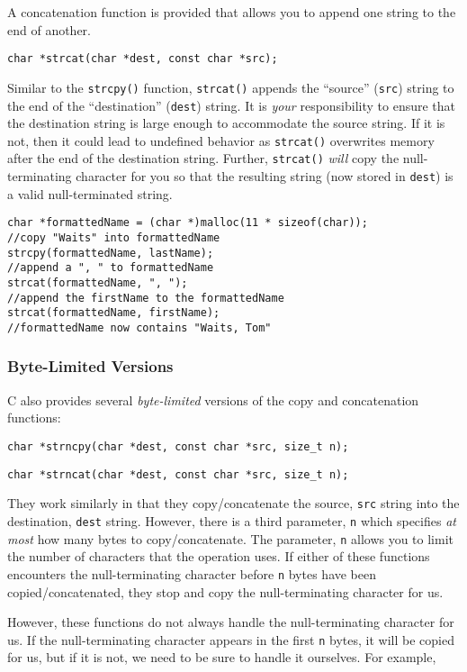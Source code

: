 A concatenation function is provided that allows you 
to append one string to the end of another.

\texttt{char *strcat(char *dest, const char *src);}

Similar to the \texttt{strcpy()} function, 
\texttt{strcat()} appends the ``source'' (\texttt{src})
string to the end of the ``destination'' (\texttt{dest})
string.  It is \emph{your} responsibility to ensure
that the destination string is large enough to accommodate the
source string.  If it is not, then it could lead to undefined
behavior as \texttt{strcat()} overwrites memory after the
end of the destination string.  Further, \texttt{strcat()}
\emph{will} copy the null-terminating character for you so that
the resulting string (now stored in \texttt{dest}) is a
valid null-terminated string.

\begin{verbatim}
char *formattedName = (char *)malloc(11 * sizeof(char));
//copy "Waits" into formattedName
strcpy(formattedName, lastName);
//append a ", " to formattedName
strcat(formattedName, ", ");
//append the firstName to the formattedName
strcat(formattedName, firstName);
//formattedName now contains "Waits, Tom"
\end{verbatim}

\subsubsection{Byte-Limited Versions}

C also provides several \emph{byte-limited} versions of
the copy and concatenation functions:

\texttt{char *strncpy(char *dest, const char *src, size_t n);}

\texttt{char *strncat(char *dest, const char *src, size_t n);}

They work similarly in that they copy/concatenate the
source, \texttt{src} string into the destination,
\texttt{dest} string.  However, there is a third
parameter, \texttt{n} which specifies \emph{at
most} how many bytes to copy/concatenate.  The parameter, 
\texttt{n} allows you to limit the number of 
characters that the operation uses.  If either of
these functions encounters the null-terminating character
before \texttt{n} bytes have been copied/concatenated, 
they stop and copy the null-terminating character for us.

However, these functions do not always handle
the null-terminating character for us.  If the null-terminating
character appears in the first \texttt{n} bytes, 
it will be copied for us, but if it is not, we need to 
be sure to handle it ourselves.  For example, 

